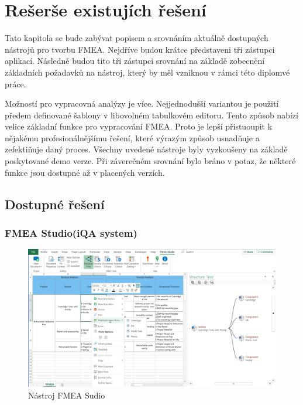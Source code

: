 \chapter{Rešerše existujích řešení}
\label{sec:nastroje}
Tato kapitola se bude zabývat popisem a srovnáním aktuálně dostupných nástrojů pro tvorbu FMEA. Nejdříve budou krátce představeni tři zástupci aplikací. Následně budou tito tři zástupci srovnání na základě zobecnění základních požadavků na nástroj, který by měl vzniknou v rámci této diplomvé práce. 

Možností pro vypracovná analýzy je více. Nejjednodušší variantou je použití předem definované šablony v libovolném tabulkovém editoru. Tento způsob nabízí velice základní funkce pro vypracování FMEA. Proto je lepší přistuoupit k nějakému profesionálnějšímu řešení, které výrazým způsob usnadňuje a zefektiňuje daný proces. Všechny uvedené nástroje byly vyzkoušeny na základě poskytované demo verze. Při záverečném srovnání bylo bráno v potaz, že některé funkce jsou dostupné až v placených verzích.

\section{Dostupné řešení}
\subsection{FMEA Studio(iQA system)}

\begin{figure}[h]
\centering
	\includegraphics[width=1.0\textwidth]{Figures/iqa.PNG}
	\caption{Nástroj FMEA Sudio }
	\label{fig:iqa}
\end{figure}

